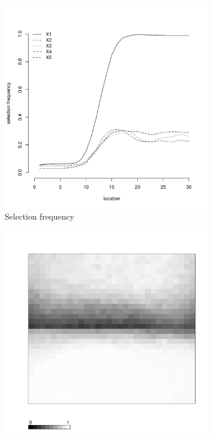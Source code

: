 \documentclass[authoryear, review, 11pt]{elsarticle}
\begin{document}
\begin{figure}
\begin{subfigure}[b]{0.45\textwidth}
		\includegraphics[width=\textwidth]{../../figures/simulation/15.13.profile_selection.pdf}
		\caption{Selection frequency}
	\end{subfigure}
	\begin{subfigure}[b]{0.45\textwidth}
	\centering
		\includegraphics[width=\textwidth]{../../figures/simulation/X1.15.13.unshrunk_bootstrap_coverage.pdf}

\end{subfigure}
\end{figure}
\end{document}
